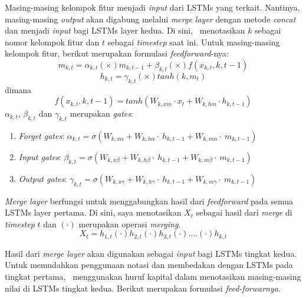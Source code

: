 \begin{enumerate}
	Masing-masing kelompok fitur menjadi \textit{input} dari LSTMs yang terkait. Nantinya, masing-masing \textit{output} akan digabung melalui \textit{merge layer} dengan metode \textit{concat} dan menjadi \textit{input} bagi LSTMs layer kedua.
	Di sini, \saya~menotasikan $ k $ sebagai nomor kelompok fitur dan $ t $ sebagai \textit{timestep} saat ini. Untuk masing-masing kelompok fitur, berikut merupakan formulasi \textit{feedforward}-nya:
	\begin{equation}\label{eq:mt2}
	m_{k,t}=\alpha_{k,t} (\times) m_{k,t-1} + \beta_{k,t} (\times) f(x_{k,t},{k,t-1})
	\end{equation}
	\begin{equation}\label{eq:ht2}
	h_{k,t}=\gamma_{k,t} (\times) tanh(k,m_{t})
	\end{equation}
	dimana
	\begin{equation}\label{eq:hf2}
	f(x_{k,t},{k,t-1})=tanh(W_{k,xm} \cdot x_{t} + W_{k,hm} \cdot h_{k,t-1})
	\end{equation}
	$ \alpha_{k,t} $, $ \beta_{k,t} $ dan $ \gamma_{k,t} $ merupakan \textit{gates}:
	\begin{enumerate}
	\item \textit{Forget gates}: $ \alpha_{k,t}=\sigma(W_{k,x\alpha}+W_{k,h\alpha}\cdot~h_{k,t-1}+W_{k,m\alpha}\cdot~m_{k,t-1}) $
	\item \textit{Input gates}: $ \beta_{k,t}=\sigma(W_{k,x\beta}+W_{k,h\beta}\cdot~h_{k,t-1}+W_{k,m\beta}\cdot~m_{k,t-1}) $
	\item \textit{Output gates}: $ \gamma_{k,t}=\sigma(W_{k,x\gamma}+W_{k,h\gamma}\cdot~h_{k,t-1}+W_{k,m\gamma}\cdot~m_{k,t-1}) $
	\end{enumerate}

	\textit{Merge layer} berfungsi untuk menggabungkan hasil dari \textit{feedforward} pada semua LSTMs layer pertama. Di sini, saya menotasikan $ X_t $ sebagai hasil dari \textit{merge} di \textit{timestep} $ t $ dan $ (\cdot) $ merupakan operasi \textit{merging}.
	\begin{equation}\label{eq:merge}
	X_t = h_{1,t} (\cdot) h_{2,t} (\cdot) h_{3,t} (\cdot) .... (\cdot) h_{k,t}
	\end{equation}

	Hasil dari \textit{merge layer} akan digunakan sebagai \textit{input} bagi LSTMs tingkat kedua. Untuk memudahkan penggunaan notasi dan membedakan dengan LSTMs pada tingkat pertama, \saya~menggunakan huruf kapital dalam menotasikan masing-masing nilai di LSTMs tingkat kedua. Berikut merupakan formulasi \textit{feed-forwarnya}.
	

\end{enumerate}
